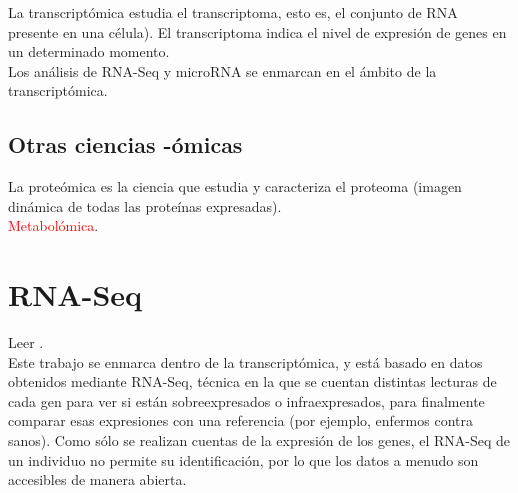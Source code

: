La transcriptómica estudia el transcriptoma, esto es, el conjunto de RNA presente en una célula). El transcriptoma indica el nivel de expresión de genes en un determinado momento.\\

Los análisis de RNA-Seq y microRNA se enmarcan en el ámbito de la transcriptómica. \\

\subsection{Otras ciencias -ómicas}

La proteómica es la ciencia que estudia y caracteriza el proteoma (imagen dinámica de todas las proteínas expresadas).\\

\textcolor{red}{Metabolómica}.

\section{RNA-Seq}

Leer \cite{Stark2019, VanVerk2013, CastilloSecilla2020}.\\

Este trabajo se enmarca dentro de la transcriptómica, y está basado en datos obtenidos mediante RNA-Seq, técnica en la que se cuentan distintas lecturas de cada gen para ver si están sobreexpresados o infraexpresados, para finalmente comparar esas expresiones con una referencia (por ejemplo, enfermos contra sanos). Como sólo se realizan cuentas de la expresión de los genes, el RNA-Seq de un individuo no permite su identificación, por lo que los datos a menudo son accesibles de manera abierta.
